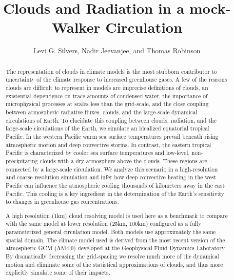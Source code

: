 \documentclass[11pt]{article}   	%
\title{Clouds and Radiation in a mock-Walker Circulation}
\author{Levi G. Silvers, Nadir Jeevanjee, and Thomas Robinson}
\begin{document}
\maketitle

\begin{abstract}

The representation of clouds in climate models is the most stubborn contributor to uncertainty of the climate response to increased 
greenhouse gases.  A few of the reasons clouds are difficult to represent in models are imprecise definitions of clouds, an existential 
dependence on trace amounts of condensed water, the importance of microphysical processes at scales less than the grid-scale, 
and the close coupling between atmospheric radiative fluxes, clouds, and the large-scale dynamical circulations of Earth.  To elucidate this 
coupling between clouds, radiation, and the large-scale circulations of the Earth, we simulate an idealized equatorial tropical Pacific.   In 
the western Pacific warm sea surface temperatures prevail beneath rising atmospheric motion and deep convective storms.   In contrast, 
the eastern tropical Pacific is characterized by cooler sea surface temperatures and low-level, non-precipitating clouds with a dry 
atmosphere above the clouds.  These regions are connected by a large-scale circulation.  We analyze this scenario in a high-resolution 
and coarse resolution simulation and infer how deep convective heating in the west Pacific can influence the atmospheric cooling 
thousands of kilometers away in the east Pacific.  This cooling is a key ingredient in the determination of the Earth's sensitivity to 
changes in greenhouse gas concentrations.

A high resolution (1km) cloud resolving model is used here as a benchmark to compare with the same model at lower 
resolution (25km, 100km) configured 
as a fully parameterized general circulation model.  Both models use approximately the same spatial domain.  The climate model used is 
derived from the most recent version of the atmospheric GCM (AM4.0) developed at the Geophysical Fluid Dynamics Laboratory.  By 
dramatically decreasing the grid-spacing we resolve much more of the dynamical motion and eliminate some of the statistical 
approximations of clouds, and thus more explicitly simulate some of their impacts.  

\end{abstract}

\end{document}
